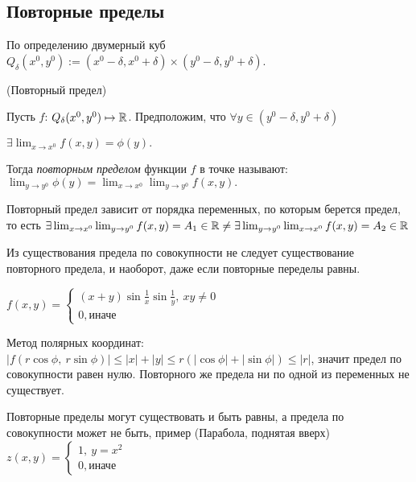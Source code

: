 \subsection{Повторные пределы}

По определению двумерный куб $Q_{\delta}(x^0, y^0) := (x^0 - \delta, x^0 + \delta) \times (y^0 - \delta, y^0 + \delta)$.

\begin{definition} (Повторный предел)
    
Пусть $f$: $Q_{\delta}(x^0, y^0) \mapsto \mathbb{R}$. Предположим, что $\forall y \in (y^0 - \delta, y^0 + \delta)$

$\exists \lim_{x \to x^{0}} f(x, y) = \phi(y).$

Тогда \textit{повторным пределом} функции $f$ в точке называют: $\lim_{y \to y^0} \phi(y) = \lim_{x \to x^0} \lim_{y \to y^0} f(x, y).$
\end{definition}

\begin{note}
    Повторный предел зависит от порядка переменных, по которым берется предел, то есть $ \exists \lim_{x \to x^0} \lim_{y \to y^0} f(x, y) = A_1 \in \mathbb{R} \neq \exists \lim_{y \to y^0} \lim_{x \to x^0} f(x, y) = A_2 \in \mathbb{R}$
\end{note}

\begin{note}

    Из существования предела по совокупности не следует существование повторного предела, и наоборот, даже если повторные переделы равны.
\end{note}

\begin{example}
    $ f(x, y) =
    \begin{cases}
        (x + y)\sin\frac{1}{x} \sin \frac{1}{y}, \ xy \neq 0\\
        0, \text{иначе}&
    \end{cases}  
    $

    Метод полярных координат: $|f(r \cos\phi, \ r \sin\phi)| \leq |x| + |y| \leq r(|\cos\phi| + |\sin \phi|) \leq|r|$, значит предел по совокупности равен нулю. Повторного же предела ни по одной из переменных не существует.

\end{example}


\begin{note}
    Повторные пределы могут существовать и быть равны, а предела по совокупности может не быть, пример (Парабола, поднятая вверх) $ z(x, y) =
    \begin{cases}
        1, \ y = x^2\\
        0, \text{иначе}&
    \end{cases}  
    $
\end{note}




